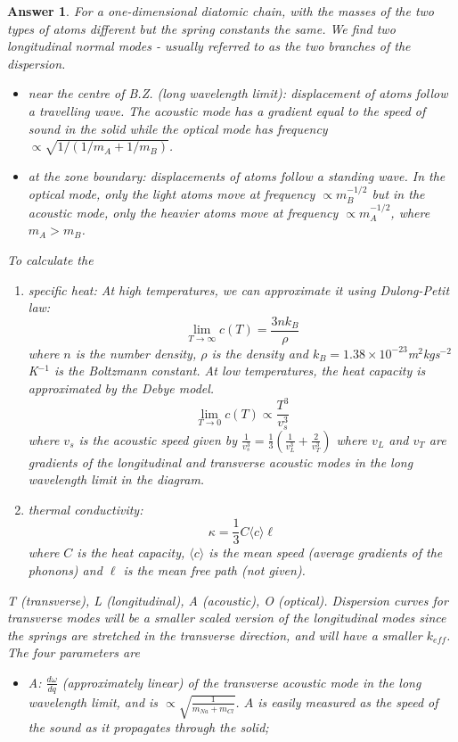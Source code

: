 \documentclass[a4paper]{article}
\newtheorem{ans}{Answer}[section]
\theoremstyle{new}
\begin{document}
\begin{ans}
For a one-dimensional diatomic chain, with the masses of the two types of atoms different but the spring constants the same. We find two longitudinal normal modes - usually referred to as the two branches of the dispersion.
\begin{itemize}
    \item near the centre of B.Z. (long wavelength limit): displacement of atoms follow a travelling wave. The acoustic mode has a gradient equal to the speed of sound in the solid while the optical mode has frequency $\propto\sqrt{1/(1/m_{A}+1/m_{B})}$.
    \item at the zone boundary: displacements of atoms follow a standing wave. In the optical mode, only the light atoms move at frequency $\propto m_B^{-1/2}$  but in the acoustic mode, only the heavier atoms move at frequency $\propto m_A^{-1/2}$, where $m_A>m_B$.
\end{itemize}
To calculate the
\begin{enumerate}[label=(\roman*)]
    \item specific heat: At high temperatures, we can approximate it using Dulong-Petit law:
    $$\lim_{T\rightarrow\infty}c(T)=\frac{3nk_B}{\rho}$$
    where $n$ is the number density, $\rho$ is the density and $k_B=1.38\times10^{-23}$m$^2$kgs$^{-2}$K$^{-1}$ is the Boltzmann constant. At low temperatures, the heat capacity is approximated by the Debye model. 
    $$\lim_{T\rightarrow0}c(T)\propto\frac{T^3}{v_s^3}$$
    where $v_s$ is the acoustic speed given by $\frac{1}{v_s^3}=\frac{1}{3}(\frac{1}{v_L^3}+\frac{2}{v_T^3})$ where $v_L$ and $v_T$ are gradients of the longitudinal and transverse acoustic modes in the long wavelength limit in the diagram.
    \item thermal conductivity: 
    $$\kappa=\frac{1}{3}C\langle c\rangle\ell$$
    where $C$ is the heat capacity, $\langle c\rangle$ is the mean speed (average gradients of the phonons) and $\ell$ is the mean free path (not given).
\end{enumerate}
T (transverse), L (longitudinal), A (acoustic), O (optical). Dispersion curves for transverse modes will be a smaller scaled version of the longitudinal modes since the springs are stretched in the transverse direction, and will have a smaller $k_{eff}$. The four parameters are
\begin{itemize}
    \item A: $\frac{d\omega}{dq}$ (approximately linear) of the transverse acoustic mode in the long wavelength limit, and is $\propto\sqrt{\frac{1}{m_{Na}+m_{Cl}}}$. $A$ is easily measured as the speed of the sound as it propagates through the solid;

\end{itemize}
\end{ans}
\end{document}

